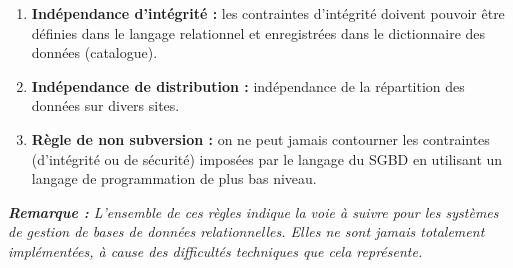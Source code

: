 \begin{enumerate}
\item \textbf{Indépendance d'intégrité :} les contraintes d'intégrité doivent pouvoir être définies dans le langage relationnel et enregistrées dans le dictionnaire des données (catalogue).
\item \textbf{Indépendance de distribution :} indépendance de la répartition des données sur divers sites.
\item \textbf{Règle de non subversion :} on ne peut jamais contourner les contraintes (d'intégrité ou de sécurité) imposées par le langage du SGBD en utilisant un langage de programmation de plus bas niveau.
\end{enumerate}

\textit{\textbf{Remarque :} L'ensemble de ces règles indique la voie à suivre pour les systèmes de gestion de bases de données relationnelles. Elles ne sont jamais totalement implémentées, à cause des difficultés techniques que cela représente.}
